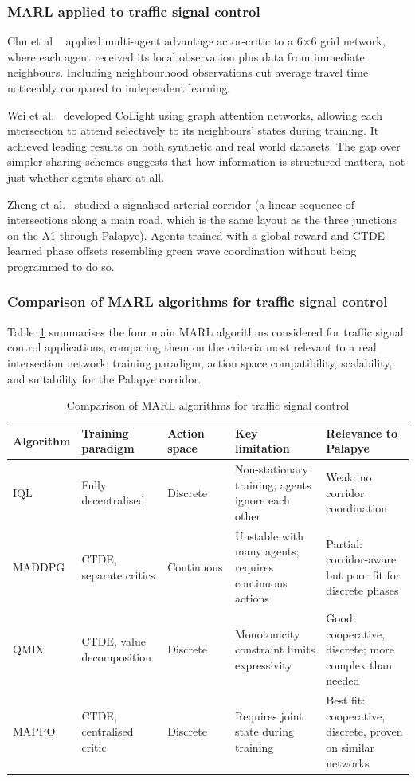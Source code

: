 ﻿\documentclass[11pt, a4paper]{report}
\begin{document}
\subsubsection{MARL applied to traffic signal control}

Chu et al \ \cite{chu2019multi} applied multi-agent advantage actor-critic to a 6$\times$6 grid network, where each agent received its local observation plus data from immediate neighbours. Including neighbourhood observations cut average travel time noticeably compared to independent learning.

Wei et al.\ \cite{wei2019colight} developed CoLight using graph attention networks, allowing each intersection to attend selectively to its neighbours' states during training. It achieved leading results on both synthetic and real world datasets. The gap over simpler sharing schemes suggests that how information is structured matters, not just whether agents share at all.

Zheng et al.\ \cite{zheng2019learning} studied a signalised arterial corridor (a linear sequence of intersections along a main road, which is the same layout as the three junctions on the A1 through Palapye). Agents trained with a global reward and CTDE learned phase offsets resembling green wave coordination without being programmed to do so.

\subsubsection{Comparison of MARL algorithms for traffic signal control}

Table~\ref{tab:marl_comparison} summarises the four main MARL algorithms considered for traffic signal control applications, comparing them on the criteria most relevant to a real intersection network: training paradigm, action space compatibility, scalability, and suitability for the Palapye corridor.

\begin{table}[H]
\centering
\caption{Comparison of MARL algorithms for traffic signal control}
\label{tab:marl_comparison}
\begin{tabular}{p{2.0cm}p{2.6cm}p{2.6cm}p{2.6cm}p{2.6cm}}
\toprule
\textbf{Algorithm} & \textbf{Training paradigm} & \textbf{Action space} & \textbf{Key limitation} & \textbf{Relevance to Palapye} \\
\midrule
IQL & Fully decentralised & Discrete & Non-stationary training; agents ignore each other & Weak: no corridor coordination \\
MADDPG & CTDE, separate critics & Continuous & Unstable with many agents; requires continuous actions & Partial: corridor-aware but poor fit for discrete phases \\
QMIX & CTDE, value decomposition & Discrete & Monotonicity constraint limits expressivity & Good: cooperative, discrete; more complex than needed \\
MAPPO & CTDE, centralised critic & Discrete & Requires joint state during training & Best fit: cooperative, discrete, proven on similar networks \\
\bottomrule
\end{tabular}
\end{table}
\end{document}
